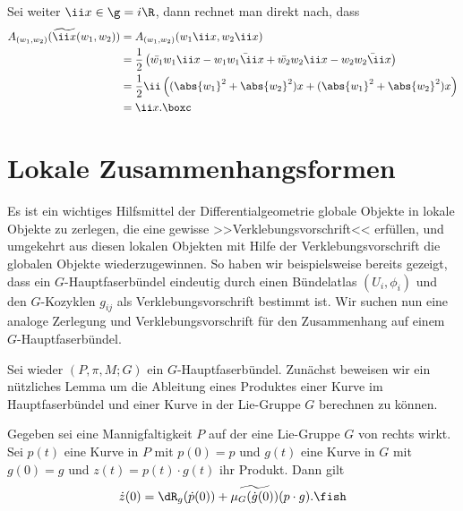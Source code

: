 \documentclass[%
	paper=a5,%
	fleqn,%
	DIV=18,%
	BCOR=0mm,
	fontsize=11pt,
	titlepage=false,%
	bibliography=totoc,
	DIV=18,%
	twoside=true,
	pdftitle=Riemannsche Geometrie,
	pdfauthor=Uwe Semmelmann,
	numbers=noendperiod]%
	{scrbook}
\begin{document}
\begin{ex}
Sei weiter $\ii x\in \g = i\R$, dann rechnet man direkt nach, dass
\begin{align*}
A_{(w_1,w_2)}(\widetilde{\ii x}(w_1,w_2)) &= 
A_{(w_1,w_2)}(w_1\ii x,w_2\ii x) \\ &= 
\frac{1}{2}
\left(\bar{w_1}w_1\ii x - w_1\bar{w_1\ii x}
+ \bar{w_2}w_2\ii x - w_2\bar{w_2\ii x}
\right) \\ 
&=
\frac{1}{2}
\ii \left((\abs{w_1}^2 + \abs{w_2}^2)x + (\abs{w_1}^2 + \abs{w_2}^2)x
\right)\\
&= \ii x.\boxc
\end{align*}
\end{ex}


\section{Lokale Zusammenhangsformen}

Es ist ein wichtiges Hilfsmittel der Differentialgeometrie globale Objekte in
lokale Objekte zu zerlegen, die eine gewisse >>Verklebungsvorschrift<< erfüllen,
und umgekehrt aus diesen lokalen Objekten mit Hilfe der Verklebungsvorschrift
die globalen Objekte wiederzugewinnen. So haben wir beispielsweise bereits
gezeigt, dass ein $G$-Hauptfaserbündel eindeutig durch einen Bündelatlas
$(U_i,\phi_i)$ und den $G$-Kozyklen $g_{ij}$ als Verklebungsvorschrift bestimmt
ist. Wir suchen nun eine analoge Zerlegung und Verklebungsvorschrift für den
Zusammenhang auf einem $G$-Hauptfaserbündel.

Sei wieder $(P,\pi,M;G)$ ein $G$-Hauptfaserbündel. Zunächst beweisen wir ein
nützliches Lemma um die Ableitung eines Produktes einer Kurve im
Hauptfaserbündel und einer Kurve in der Lie-Gruppe $G$ berechnen zu können.

\begin{lem}[Produktformel]
\label{prop:Produktformel}
Gegeben sei eine Mannigfaltigkeit $P$ auf der eine
Lie-Gruppe $G$ von rechts wirkt. Sei $p(t)$ eine Kurve in $P$ mit $p(0) = p$ und
$g(t)$  eine Kurve in $G$ mit $g(0) = g$ und $z(t) = p(t)\cdot g(t)$ ihr
Produkt. Dann gilt
\begin{align*}
\dot{z}(0) = \dR_g(\dot{p}(0)) + \widetilde{\mu_G(\dot{g}(0))}(p\cdot g).\fish
\end{align*}
\end{lem}
\end{document}
